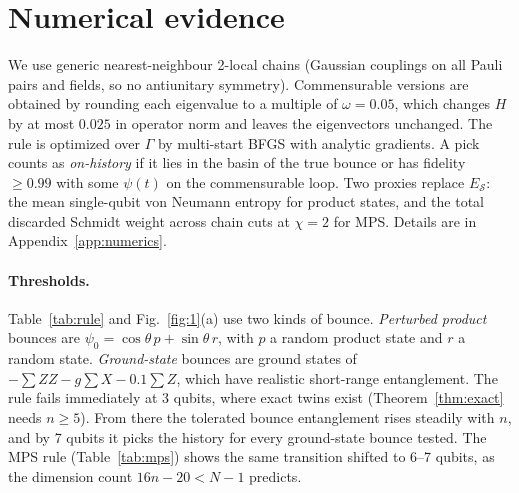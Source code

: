 \documentclass[11pt]{article}
\theoremstyle{definition}
\theoremstyle{remark}
\begin{document}
\section{Numerical evidence}
\label{sec:numerics}

We use generic nearest-neighbour 2-local chains (Gaussian couplings on all Pauli pairs and fields, so no antiunitary symmetry). Commensurable versions are obtained by rounding each eigenvalue to a multiple of $\omega=0.05$, which changes $H$ by at most $0.025$ in operator norm and leaves the eigenvectors unchanged. The rule is optimized over $\Gamma$ by multi-start BFGS with analytic gradients. A pick counts as \emph{on-history} if it lies in the basin of the true bounce or has fidelity $\ge0.99$ with some $\psi(t)$ on the commensurable loop. Two proxies replace $E_{\mathcal S}$: the mean single-qubit von Neumann entropy for product states, and the total discarded Schmidt weight across chain cuts at $\chi=2$ for MPS. Details are in Appendix~\ref{app:numerics}.

\paragraph{Thresholds.} Table~\ref{tab:rule} and Fig.~\ref{fig:1}(a) use two kinds of bounce. \emph{Perturbed product} bounces are $\psi_0=\cos\theta\,p+\sin\theta\,r$, with $p$ a random product state and $r$ a random state. \emph{Ground-state} bounces are ground states of $-\sum ZZ-g\sum X-0.1\sum Z$, which have realistic short-range entanglement. The rule fails immediately at 3 qubits, where exact twins exist (Theorem~\ref{thm:exact} needs $n\ge5$). From there the tolerated bounce entanglement rises steadily with $n$, and by 7 qubits it picks the history for every ground-state bounce tested. The MPS rule (Table~\ref{tab:mps}) shows the same transition shifted to 6--7 qubits, as the dimension count $16n-20<N-1$ predicts.
\end{document}
